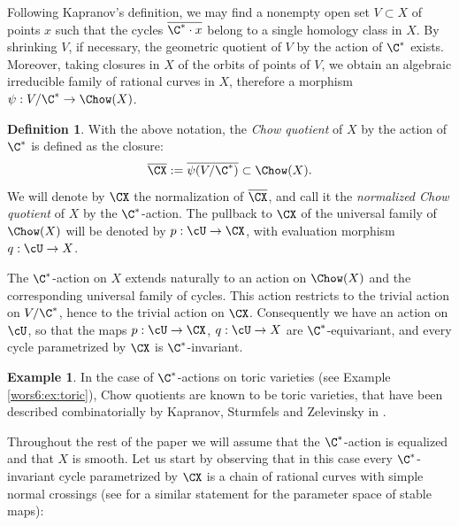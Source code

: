 \documentclass[reqno]{amsproc}
\theoremstyle{definition}
\newtheorem{definition}[theorem]{Definition}
\newtheorem{example}[theorem]{Example}
\begin{document}
Following Kapranov's definition,  we may find a nonempty open set $V\subset X$ of points $x$ such that the cycles $\overline{\C^*\cdot x}$ belong to a single homology class in $X$. By shrinking $V$, if necessary, the geometric quotient of $V$ by the action of $\C^*$ exists. Moreover, taking closures in $X$ of the orbits of points of $V$, we obtain an algebraic irreducible family of rational curves in $X$, therefore a morphism $\psi:V/\C^*\to \Chow(X)$.

\begin{definition}
With the above notation, the {\em Chow quotient} of $X$ by the action of $\C^*$ is defined as the closure:
$$
\overline{\CX}:=\overline{\psi(V/\C^*)}\subset \Chow(X).
$$
We will denote by $\CX$ the normalization of $\overline{\CX}$, and call it the {\em normalized Chow quotient} of $X$ by the $\C^*$-action. 
The pullback to $\CX$ of the universal family of $\Chow(X)$ will be denoted by $p:\cU\to \CX$, with evaluation morphism $q:\cU\to X$.
\end{definition}

The  $\C^*$-action on $X$ extends naturally to an action on $\Chow(X)$ and the corresponding universal family of cycles. This action restricts to the trivial action on $V/\C^*$, hence to the trivial action on $\CX$. Consequently we have an action on $\cU$, so that the maps $p:\cU\to\CX$, $q:\cU\to X$ are $\C^*$-equivariant, and every cycle parametrized by $\CX$ is $\C^*$-invariant. 

\begin{example}\label{wors6:ex:toric2}
In the case of $\C^*$-actions on toric varieties (see Example \ref{wors6:ex:toric}), Chow quotients are known to be toric varieties, that have been described combinatorially by Kapranov, Sturmfels and Zelevinsky in \cite{wors6-KSZ}. 
\end{example}

Throughout the rest of the paper we will assume that  the  $\C^*$-action is  equalized and that $X$ is smooth. Let us start by observing that in this case every $\C^*$-invariant cycle parametrized by $\CX$ is a chain of rational curves with simple normal crossings
(see \cite[Lemma 3.12]{wors6-MMW} for a similar statement for the parameter space of stable maps):
\end{document}

